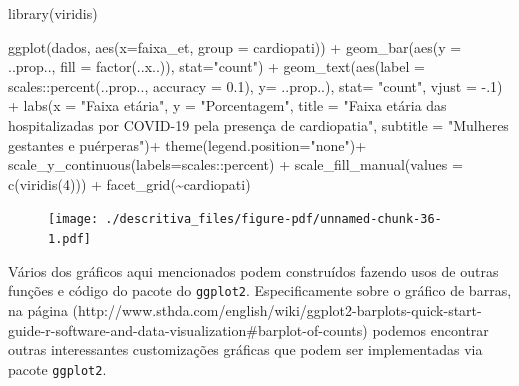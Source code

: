 \documentclass[
  letterpaper,
  DIV=11,
  numbers=noendperiod]{scrreprt}
\newenvironment{Shaded}{\begin{snugshade}}{\end{snugshade}}
\newcommand{\AttributeTok}[1]{\textcolor[rgb]{0.40,0.45,0.13}{#1}}
\newcommand{\DecValTok}[1]{\textcolor[rgb]{0.68,0.00,0.00}{#1}}
\newcommand{\FloatTok}[1]{\textcolor[rgb]{0.68,0.00,0.00}{#1}}
\newcommand{\FunctionTok}[1]{\textcolor[rgb]{0.28,0.35,0.67}{#1}}
\newcommand{\NormalTok}[1]{\textcolor[rgb]{0.00,0.23,0.31}{#1}}
\newcommand{\SpecialCharTok}[1]{\textcolor[rgb]{0.37,0.37,0.37}{#1}}
\newcommand{\StringTok}[1]{\textcolor[rgb]{0.13,0.47,0.30}{#1}}
\begin{document}
\begin{Shaded}
\begin{Highlighting}[]
\FunctionTok{library}\NormalTok{(viridis)}

\FunctionTok{ggplot}\NormalTok{(dados, }\FunctionTok{aes}\NormalTok{(}\AttributeTok{x=}\NormalTok{faixa\_et, }\AttributeTok{group =}\NormalTok{ cardiopati))  }\SpecialCharTok{+} 
  \FunctionTok{geom\_bar}\NormalTok{(}\FunctionTok{aes}\NormalTok{(}\AttributeTok{y =}\NormalTok{ ..prop.., }\AttributeTok{fill =} \FunctionTok{factor}\NormalTok{(..x..)), }\AttributeTok{stat=}\StringTok{"count"}\NormalTok{) }\SpecialCharTok{+}
  \FunctionTok{geom\_text}\NormalTok{(}\FunctionTok{aes}\NormalTok{(}\AttributeTok{label =}\NormalTok{ scales}\SpecialCharTok{::}\FunctionTok{percent}\NormalTok{(..prop.., }\AttributeTok{accuracy =} \FloatTok{0.1}\NormalTok{), }\AttributeTok{y=}\NormalTok{ ..prop..), }\AttributeTok{stat=} \StringTok{"count"}\NormalTok{, }\AttributeTok{vjust =} \SpecialCharTok{{-}}\NormalTok{.}\DecValTok{1}\NormalTok{) }\SpecialCharTok{+}
  \FunctionTok{labs}\NormalTok{(}\AttributeTok{x =} \StringTok{"Faixa etária"}\NormalTok{, }\AttributeTok{y =} \StringTok{"Porcentagem"}\NormalTok{, }\AttributeTok{title =} \StringTok{"Faixa etária das hospitalizadas por COVID{-}19 pela presença de cardiopatia"}\NormalTok{, }\AttributeTok{subtitle =} \StringTok{"Mulheres gestantes e puérperas"}\NormalTok{)}\SpecialCharTok{+}
  \FunctionTok{theme}\NormalTok{(}\AttributeTok{legend.position=}\StringTok{"none"}\NormalTok{)}\SpecialCharTok{+}
  \FunctionTok{scale\_y\_continuous}\NormalTok{(}\AttributeTok{labels=}\NormalTok{scales}\SpecialCharTok{::}\NormalTok{percent) }\SpecialCharTok{+}
  \FunctionTok{scale\_fill\_manual}\NormalTok{(}\AttributeTok{values =} \FunctionTok{c}\NormalTok{(}\FunctionTok{viridis}\NormalTok{(}\DecValTok{4}\NormalTok{))) }\SpecialCharTok{+}
  \FunctionTok{facet\_grid}\NormalTok{(}\SpecialCharTok{\textasciitilde{}}\NormalTok{cardiopati)}
\end{Highlighting}
\end{Shaded}

\begin{figure}[H]

{\centering \texttt{[image: ./descritiva\_files/figure-pdf/unnamed-chunk-36-1.pdf]}

}

\end{figure}

Vários dos gráficos aqui mencionados podem construídos fazendo usos de
outras funções e código do pacote do \texttt{ggplot2}. Especificamente
sobre o gráfico de barras, na página
(http://www.sthda.com/english/wiki/ggplot2-barplots-quick-start-guide-r-software-and-data-visualization\#barplot-of-counts)
podemos encontrar outras interessantes customizações gráficas que podem
ser implementadas via pacote \texttt{ggplot2}.
\end{document}
